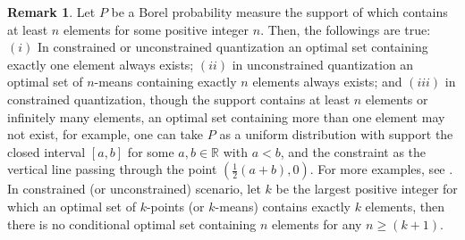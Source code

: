 \documentclass[12pt, reqno]{amsart}
\theoremstyle{plain}
\theoremstyle{definition}
\newtheorem{remark}[subsection]{Remark}
\newcommand{\D}[1]{\mathbb{#1}}%
\begin{document}
\begin{remark} Let $P$ be a Borel probability measure the support of which contains at least $n$ elements for some positive integer $n$. Then, the followings are true: $(i)$ In constrained or unconstrained quantization an optimal set containing exactly one element always exists; $(ii)$ in unconstrained quantization an optimal set of $n$-means containing exactly $n$ elements always exists; and $(iii)$ in constrained quantization, though the support contains at least $n$ elements or infinitely many elements, an optimal set containing more than one element may not exist, for example, one can take $P$ as a uniform distribution with support the closed interval $[a, b] $ for some $a, b\in \D R$ with $a<b$, and the constraint as the vertical line passing through the point $(\frac 12(a+b), 0)$. For more examples, see \cite{PR1}.  In constrained (or unconstrained) scenario, let $k$ be the largest positive integer for which an optimal set of $k$-points (or $k$-means) contains exactly $k$ elements, then there is no conditional optimal set containing $n$ elements for any $n\geq (k+1)$. 
\end{remark} 
\end{document}
